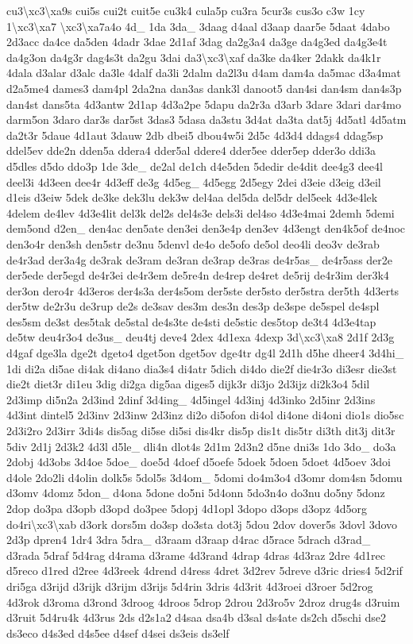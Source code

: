 \begin{DoxyCompactItemize}
cu3\textbackslash{}xc3\textbackslash{}xa9s cui5s cui2t cuit5e cu3k4 cula5p cu3ra 5cur3s cus3o c3w 1cy 1\textbackslash{}xc3\textbackslash{}xa7 \textbackslash{}xc3\textbackslash{}xa7a4o 4d\-\_\- 1da 3da\-\_\- 3daag d4aal d3aap daar5e 5daat 4dabo 2d3acc da4ce da5den 4dadr 3dae 2d1af 3dag da2g3a4 da3ge da4g3ed da4g3e4t da4g3on da4g3r dag4s3t da2gu 3dai da3\textbackslash{}xc3\textbackslash{}xaf da3ke da4ker 2dakk da4k1r 4dala d3alar d3alc da3le 4dalf da3li 2dalm da2l3u d4am dam4a da5mac d3a4mat d2a5me4 dames3 dam4pl 2da2na dan3as dank3l danoot5 dan4si dan4sm dan4s3p dan4st dans5ta 4d3antw 2d1ap 4d3a2pe 5dapu da2r3a d3arb 3dare 3dari dar4mo darm5on 3daro dar3s dar5st 3das3 5dasa da3stu 3d4at da3ta dat5j 4d5atl 4d5atm da2t3r 5daue 4d1aut 3dauw 2db dbei5 dbou4w5i 2d5c 4d3d4 ddags4 ddag5sp ddel5ev dde2n dden5a ddera4 dder5al ddere4 dder5ee dder5ep dder3o ddi3a d5dles d5do ddo3p 1de 3de\-\_\- de2al de1ch d4e5den 5dedir de4dit dee4g3 dee4l deel3i 4d3een dee4r 4d3eff de3g 4d5eg\-\_\- 4d5egg 2d5egy 2dei d3eie d3eig d3eil d1eis d3eiw 5dek de3ke dek3lu dek3w del4aa del5da del5dr del5eek 4d3e4lek 4delem de4lev 4d3e4lit del3k del2s del4s3e dels3i del4so 4d3e4mai 2demh 5demi dem5ond d2en\-\_\- den4ac den5ate den3ei den3e4p den3ev 4d3engt den4k5of de4noc den3o4r den3sh den5str de3nu 5denvl de4o de5ofo de5ol deo4li deo3v de3rab de4r3ad der3a4g de3rak de3ram de3ran de3rap de3ras de4r5as\-\_\- de4r5ass der2e der5ede der5egd de4r3ei de4r3em de5re4n de4rep de4ret de5rij de4r3im der3k4 der3on dero4r 4d3eros der4s3a der4s5om der5ste der5sto der5stra der5th 4d3erts der5tw de2r3u de3rup de2s de3sav des3m des3n des3p de3spe de5spel de4spl des5sm de3st des5tak de5stal de4s3te de4sti de5stic des5top de3t4 4d3e4tap de5tw deu4r3o4 de3us\-\_\- deu4tj deve4 2dex 4d1exa 4dexp 3d\textbackslash{}xc3\textbackslash{}xa8 2d1f 2d3g d4gaf dge3la dge2t dgeto4 dget5on dget5ov dge4tr dg4l 2d1h d5he dheer4 3d4hi\-\_\- 1di di2a di5ae di4ak di4ano dia3s4 di4atr 5dich di4do die2f die4r3o di3esr die3st die2t diet3r di1eu 3dig di2ga dig5aa diges5 dijk3r di3jo 2d3ijz di2k3o4 5dil 2d3imp di5n2a 2d3ind 2dinf 3d4ing\-\_\- 4d5ingel 4d3inj 4d3inko 2d5inr 2d3ins 4d3int dintel5 2d3inv 2d3inw 2d3inz di2o di5ofon di4ol di4one di4oni dio1s dio5sc 2d3i2ro 2d3irr 3di4s dis5ag di5se di5si dis4kr dis5p dis1t dis5tr di3th dit3j dit3r 5div 2d1j 2d3k2 4d3l d5le\-\_\- dli4n dlot4s 2d1m 2d3n2 d5ne dni3s 1do 3do\-\_\- do3a 2dobj 4d3obs 3d4oe 5doe\-\_\- doe5d 4doef d5oefe 5doek 5doen 5doet 4d5oev 3doi d4ole 2do2li d4olin dolk5s 5dol5s 3d4om\-\_\- 5domi do4m3o4 d3omr dom4sn 5domu d3omv 4domz 5don\-\_\- d4ona 5done do5ni 5d4onn 5do3n4o do3nu do5ny 5donz 2dop do3pa d3opb d3opd do3pee 5dopj 4d1opl 3dopo d3ops d3opz 4d5org do4ri\textbackslash{}xc3\textbackslash{}xab d3ork dors5m do3sp do3sta dot3j 5dou 2dov dover5s 3dovl 3dovo 2d3p dpren4 1dr4 3dra 5dra\-\_\- d3raam d3raap d4rac d5race 5drach d3rad\-\_\- d3rada 5draf 5d4rag d4rama d3rame 4d3rand 4drap 4dras 4d3raz 2dre 4d1rec d5reco d1red d2ree 4d3reek 4drend d4ress 4dret 3d2rev 5dreve d3ric dries4 5d2rif dri5ga d3rijd d3rijk d3rijm d3rijs 5d4rin 3dris 4d3rit 4d3roei d3roer 5d2rog 4d3rok d3roma d3rond 3droog 4droos 5drop 2drou 2d3ro5v 2droz drug4s d3ruim d3ruit 5d4ru4k 4d3rus 2ds d2s1a2 d4saa dsa4b d3sal ds4ate ds2ch d5schi dse2 ds3eco d4s3ed d4s5ee d4sef d4sei ds3eis ds3elf 
\end{DoxyCompactItemize}

